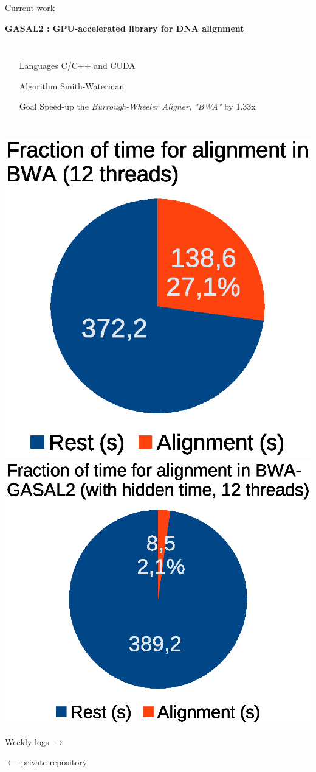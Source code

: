 
\begin{frame}{Current work}

	\begin{center}
		\textbf{GASAL2 : GPU-accelerated library for DNA alignment}
	
	\begin{columns}
		\begin{itemize}
			\item[Languages] C/C++ and CUDA
			\item[Algorithm] Smith-Waterman
			\item[Goal] Speed-up the \emph{Burrough-Wheeler Aligner, "BWA"} by 1.33x
		\end{itemize}	
	\end{columns}


		\includegraphics[height=0.35\textwidth]{share_bwa}
		\includegraphics[height=0.35\textwidth]{share_bwa-gasal2}
	
	
	\end{center}
\tiny
 		 \hfill 
		Weekly logs $\rightarrow$ 
		
		 $\leftarrow$ private repository 
		
		
	
\end{frame}